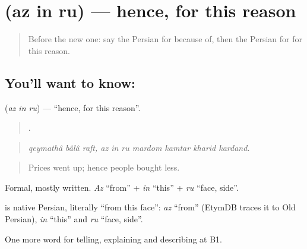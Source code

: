 \section[\texorpdfstring{\fa{از} \fa{این} \fa{رو} (az in ru)}{از این رو (az in ru)}]{   (az in ru) — hence, for this reason}

\label{lesson:FA-C371-az-in-ru}



\begin{quote}
Before the new one: say the Persian for because of, then the Persian for for this reason.
\end{quote}

\subsection*{You'll want to know:   }
\textbf{  } (\emph{az in ru}) — \textquotedblleft{}hence, for this reason\textquotedblright{}.

\begin{quote}
         .
\end{quote}

\begin{quote}
\emph{qeymathâ bâlâ raft, az in ru mardom kamtar kharid kardand.}
\end{quote}

\begin{quote}
Prices went up; hence people bought less.
\end{quote}

Formal, mostly written. \emph{Az} \textquotedblleft{}from\textquotedblright{} + \emph{in} \textquotedblleft{}this\textquotedblright{} + \emph{ru} \textquotedblleft{}face, side\textquotedblright{}.

\begin{cousinweb}
\textbf{  } is native Persian, literally \textquotedblleft{}from this face\textquotedblright{}: \emph{az} \textquotedblleft{}from\textquotedblright{} (EtymDB traces it to Old Persian), \emph{in} \textquotedblleft{}this\textquotedblright{} and \emph{ru} \textquotedblleft{}face, side\textquotedblright{}.
\end{cousinweb}

\begin{grammarlens}[title={What you've built}]
One more word for telling, explaining and describing at B1.
\end{grammarlens}

